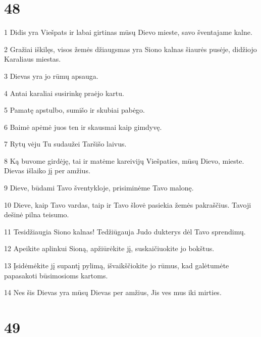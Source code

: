\chapter{48}


\par 1 Didis yra Viešpats ir labai girtinas mūsų Dievo mieste, savo šventajame kalne. 
\par 2 Gražiai iškilęs, visos žemės džiaugsmas yra Siono kalnas šiaurės pusėje, didžiojo Karaliaus miestas. 
\par 3 Dievas yra jo rūmų apsauga. 
\par 4 Antai karaliai susirinkę praėjo kartu. 
\par 5 Pamatę apstulbo, sumišo ir skubiai pabėgo. 
\par 6 Baimė apėmė juos ten ir skausmai kaip gimdyvę. 
\par 7 Rytų vėju Tu sudaužei Taršišo laivus. 
\par 8 Ką buvome girdėję, tai ir matėme kareivijų Viešpaties, mūsų Dievo, mieste. Dievas išlaiko jį per amžius. 
\par 9 Dieve, būdami Tavo šventykloje, prisiminėme Tavo malonę. 
\par 10 Dieve, kaip Tavo vardas, taip ir Tavo šlovė pasiekia žemės pakraščius. Tavoji dešinė pilna teisumo. 
\par 11 Tesidžiaugia Siono kalnas! Tedžiūgauja Judo dukterys dėl Tavo sprendimų. 
\par 12 Apeikite aplinkui Sioną, apžiūrėkite jį, suskaičiuokite jo bokštus. 
\par 13 Įsidėmėkite jį supantį pylimą, išvaikščiokite jo rūmus, kad galėtumėte papasakoti būsimosioms kartoms. 
\par 14 Nes šis Dievas yra mūsų Dievas per amžius, Jis ves mus iki mirties.



\chapter{49}


